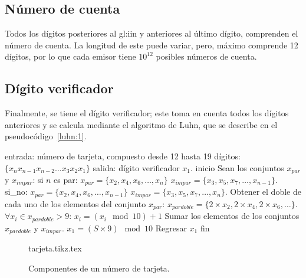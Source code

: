 \subsection{Número de cuenta}
Todos los dígitos posteriores al \gls{gl:iin} y anteriores al último dígito,
comprenden el número de cuenta. La longitud de este puede variar, pero, máximo
comprende 12 dígitos, por lo que cada emisor tiene $10^{12}$ posibles números
de cuenta.

\subsection{Dígito verificador}
\label{sec:algoritmo_luhn}

Finalmente, se tiene el dígito verificador; este toma en cuenta todos los
dígitos anteriores y se calcula mediante el algoritmo de Luhn, que se describe
en el pseudocódigo~\ref{luhn:1}.

\begin{pseudocodigo}[%
    caption={Algoritmo de Luhn.},
    label={luhn:1}%
  ]
    entrada: número de tarjeta, compuesto desde 12 hasta 19 dígitos:
             $\{x_{n} x_{n-1} x_{n-2} \dots x_3 x_2 x_1\}$
    salida:  dígito verificador $x_1$.
    inicio
      Sean los conjuntos $x_{par}$ y $x_{impar}$:
          si $n$ es par:
              $x_{par} = \{x_2, x_4, x_6, \dots, x_n\}$
              $x_{impar} = \{x_3, x_5, x_7, \dots, x_{n-1}\}$.
          si_no:
              $x_{par} = \{x_2, x_4, x_6, \dots, x_{n-1}\}$
              $x_{impar} = \{x_3, x_5, x_7, \dots, x_n\}$.
      Obtener el doble de cada uno de los elementos del conjunto $x_{par}$:
        $x_{par doble} = \{2 \times x_2, 2 \times x_4, 2 \times x_6, \dots \}$.
      $\forall x_i \in x_{par doble} > 9$:
          $x_i = (x_i \mod 10) + 1 $
      Sumar los elementos de los conjuntos $x_{par doble}$ y $x_{impar}$.
      $x_1 = (S \times 9) \mod 10$
      Regresar $x_1$
    fin
\end{pseudocodigo}

\begin{figure}
  \begin{center}
    {tarjeta.tikz.tex}
    \caption{Componentes de un número de tarjeta.}\label{figura:pan}
   \end{center}
\end{figure}
